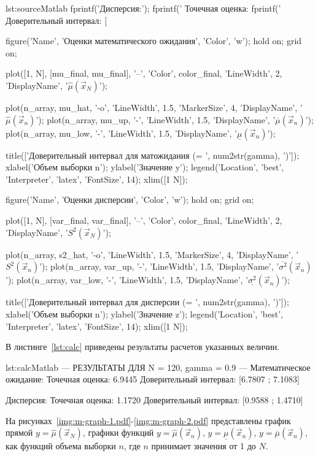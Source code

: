 \begin{listing}{lst:source}{Matlab}
fprintf('Дисперсия:\n');
fprintf('  Точечная оценка: %
fprintf('  Доверительный интервал: [%


figure('Name', 'Оценки математического ожидания', 'Color', 'w');
hold on; grid on;

plot([1, N], [mu_final, mu_final], '--', 'Color', color_final, 'LineWidth', 2, 'DisplayName', '$\hat{\mu}(\vec{x}_N)$');

plot(n_array, mu_hat, '-o', 'LineWidth', 1.5, 'MarkerSize', 4, 'DisplayName', '$\hat{\mu}(\vec{x}_n)$');
plot(n_array, mu_up, '-', 'LineWidth', 1.5, 'DisplayName', '$\overline{\mu}(\vec{x}_n)$');
plot(n_array, mu_low, '-', 'LineWidth', 1.5, 'DisplayName', '$\underline{\mu}(\vec{x}_n)$');

title(['Доверительный интервал для матожидания (\gamma = ', num2str(gamma), ')']);
xlabel('Объем выборки n');
ylabel('Значение y');
legend('Location', 'best', 'Interpreter', 'latex', 'FontSize', 14);
xlim([1 N]);

figure('Name', 'Оценки дисперсии', 'Color', 'w');
hold on; grid on;

plot([1, N], [var_final, var_final], '--', 'Color', color_final, 'LineWidth', 2, 'DisplayName', '$S^2(\vec{x}_N)$');

plot(n_array, s2_hat, '-o', 'LineWidth', 1.5, 'MarkerSize', 4, 'DisplayName', '$S^2(\vec{x}_n)$');
plot(n_array, var_up, '-', 'LineWidth', 1.5, 'DisplayName', '$\overline{\sigma^2}(\vec{x}_n)$');
plot(n_array, var_low, '-', 'LineWidth', 1.5, 'DisplayName', '$\underline{\sigma^2}(\vec{x}_n)$');

title(['Доверительный интервал для дисперсии (\gamma = ', num2str(gamma), ')']);
xlabel('Объем выборки n');
ylabel('Значение z');
legend('Location', 'best', 'Interpreter', 'latex', 'FontSize', 14);
xlim([1 N]);
\end{listing}

В листинге~\ref{lst:calc} приведены результаты расчетов указанных величин.
\begin{listing}{lst:calc}{Matlab}
--- РЕЗУЛЬТАТЫ ДЛЯ N = 120, gamma = 0.9 ---
Математическое ожидание:
  Точечная оценка: 6.9445
  Доверительный интервал: [6.7807 ; 7.1083]

Дисперсия:
  Точечная оценка: 1.1720
  Доверительный интервал: [0.9588 ; 1.4710]
\end{listing}

На рисунках~\ref{img:m-graph-1.pdf}-\ref{img:m-graph-2.pdf} представлены 
график прямой \( y=\hat{\mu}(\vec{x}_N) \),
графики функций \( y=\hat{\mu}(\vec{x}_n) \), \( y=\underline{\mu}(\vec{x}_n) \),
\( y=\overline{\mu}(\vec{x}_n) \), как функций объема выборки \( n \), 
где \( n \) принимает значения от 1 до \( N \).


